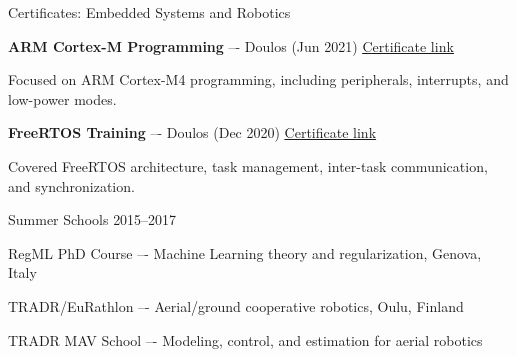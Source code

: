 
\begin{cventries}

  \cventry
    {Certificates: Embedded Systems and Robotics} %
    {} %
    {} %
    {} %
    {
      \begin{cvitems}
        \item {\textbf{ARM Cortex-M Programming} –- Doulos (Jun 2021) \underline{\href{https://shorturl.at/opCKZ}{Certificate link}}}
          \begin{cvparagraph}
            Focused on ARM Cortex-M4 programming, including peripherals, interrupts, and low-power modes.
          \end{cvparagraph}
          \item {\textbf{FreeRTOS Training} –- Doulos (Dec 2020) \underline{\href{https://bit.ly/3ppdcOF}{Certificate link}}}
          \begin{cvparagraph}
            Covered FreeRTOS architecture, task management, inter-task communication, and synchronization.
          \end{cvparagraph}
      \end{cvitems}
    }

  \cventry
    {Summer Schools} %
    {} %
    {} %
    {2015--2017} %
    {
      \begin{cvitems}
        \item {RegML PhD Course –- Machine Learning theory and regularization, Genova, Italy}
        \item {TRADR/EuRathlon –- Aerial/ground cooperative robotics, Oulu, Finland}
        \item {TRADR MAV School –- Modeling, control, and estimation for aerial robotics}
      \end{cvitems}
    }

\end{cventries}
